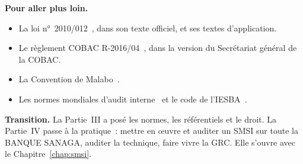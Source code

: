 \bigskip

\begin{boxinfo}
\textbf{Pour aller plus loin.}
\begin{itemize}
    \item La loi n°~2010/012~\cite{loi2010012}, dans son texte officiel, et
          ses textes d'application.
    \item Le règlement COBAC R-2016/04~\cite{cobac2016r04}, dans la version
          du Secrétariat général de la COBAC.
    \item La Convention de Malabo~\cite{ua2014malabo}.
    \item Les normes mondiales d'audit interne~\cite{iia2024gias} et le code
          de l'IESBA~\cite{iesba2023code}.
\end{itemize}
\end{boxinfo}

\begin{boxinfo}
\textbf{Transition.} La Partie~III a posé les normes, les référentiels et
le droit. La Partie~IV passe à la pratique~: mettre en œuvre et auditer un
SMSI sur toute la BANQUE SANAGA, auditer la technique, faire vivre la GRC.
Elle s'ouvre avec le Chapitre~\ref{chap:smsi}.
\end{boxinfo}
